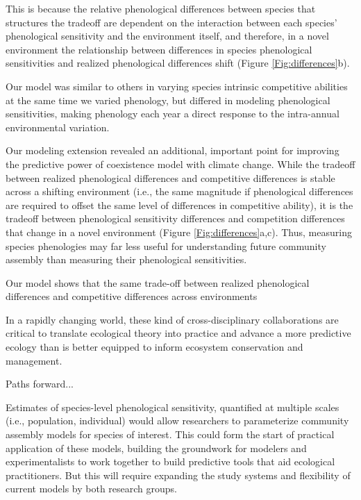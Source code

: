 This is because the relative phenological differences between species that structures the tradeoff are dependent on the interaction between each species' phenological sensitivity and the environment itself, and therefore, in a novel environment the relationship between differences in species phenological sensitivities and realized phenological differences shift (Figure \ref{Fig:differences}b). 


Our model was similar to others in varying species intrinsic competitive abilities at the same time we varied phenology, but differed in modeling phenological sensitivities, making phenology each year a direct response to the intra-annual environmental variation. %


Our modeling extension revealed an additional, important point for improving the predictive power of coexistence model with climate change. While the tradeoff between realized phenological differences and competitive differences is stable across a shifting environment (i.e., the same magnitude if phenological differences are required to offset the same level of differences in competitive ability), it is the tradeoff between phenological sensitivity differences and competition differences that change in a novel environment (Figure \ref{Fig:differences}a,c). Thus, measuring species phenologies may far less useful for understanding future community assembly than measuring their phenological sensitivities.

Our model shows that the same trade-off between realized phenological differences and competitive differences across environments 

In a rapidly changing world, these kind of cross-disciplinary collaborations are critical to translate ecological theory into practice and advance a more predictive ecology than is better equipped to inform ecosystem conservation and management.

Paths forward...

Estimates of species-level phenological sensitivity, quantified at multiple scales (i.e., population, individual) would allow researchers to parameterize community assembly models for species of interest. This could form the start of practical application of these models, building the groundwork for modelers and experimentalists to work together to build predictive tools that aid ecological practitioners. But this will require expanding the study systems and flexibility of current models by both research groups. 


